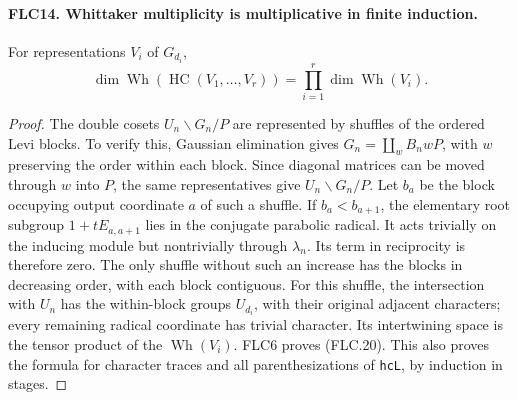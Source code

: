 \paragraph{FLC14. Whittaker multiplicity is multiplicative in finite induction.}
\label{claim:FLC14}
For representations $V_i$ of $G_{d_i}$,
\[
 \dim\operatorname{Wh}(\operatorname{HC}(V_1,\ldots,V_r))
                    =\prod_{i=1}^r\dim\operatorname{Wh}(V_i).
 \tag{FLC.20}
\]
\begin{proof}
The double cosets $U_n\backslash G_n/P$ are represented by
shuffles of the ordered Levi blocks.  To verify this, Gaussian
elimination gives $G_n=\coprod_w B_n wP$, with $w$ preserving
the order within each block.  Since diagonal matrices can
be moved through $w$ into $P$, the same representatives give
$U_n\backslash G_n/P$.
Let $b_a$ be the block occupying output coordinate $a$ of
such a shuffle.  If $b_a<b_{a+1}$, the elementary root subgroup
$1+tE_{a,a+1}$ lies in the conjugate parabolic radical.
It acts trivially on the inducing module but nontrivially
through $\lambda_n$.  Its term in reciprocity is therefore
zero.  The only shuffle without such an increase has the
blocks in decreasing order, with each block contiguous.
For this shuffle, the intersection with $U_n$ has the
within-block groups $U_{d_i}$, with their original adjacent
characters; every remaining radical coordinate has trivial
character.  Its intertwining space is the tensor product
of the $\operatorname{Wh}(V_i)$.  FLC6 proves (FLC.20).
This also proves the formula for character traces and all
parenthesizations of \texttt{hcL}, by induction in stages.
\end{proof}

